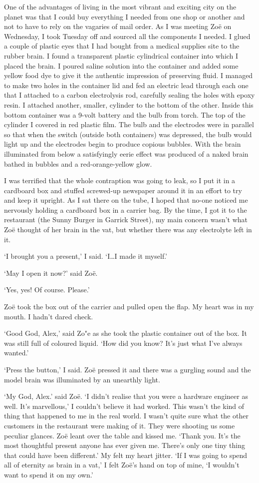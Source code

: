 One of the advantages of living in the most vibrant and exciting
city on the planet was that I could buy everything I needed from one
shop or another and not to have to rely on the vagaries of mail
order. As I was meeting Zoë on Wednesday, I took Tuesday off
and sourced  all the components I needed. I glued a couple of
plastic eyes that I had bought from a medical supplies site to the
rubber brain. I found a transparent plastic cylindrical container
into which I placed the brain. I poured saline solution into the
container and added some yellow food dye to give it the authentic
impression of preserving fluid. I managed to make two holes in the
container lid and fed an electric lead through each one that I
attached to a carbon electrolysis rod, carefully sealing the holes
with epoxy resin. I attached another, smaller, cylinder to the
bottom of the other. Inside this bottom container was a 9-volt battery and the bulb from torch. The top of the
cylinder I covered in red plastic film. The bulb and the electrodes
were in parallel so that when the switch (outside both containers)
was depressed, the bulb would light up and the electrodes begin to
produce copious bubbles. With the brain illuminated from below a
satisfyingly eerie effect was produced of a naked brain bathed in
bubbles and a red-orange-yellow glow.

I was terrified that the whole contraption was going to leak, so I
put it in a cardboard box and stuffed screwed-up newspaper around it
in an effort to try and keep it upright. As I sat there on the tube,
I hoped that no-one noticed me nervously holding a cardboard box in
a carrier bag. By the time, I got it to the restaurant (the Sunny
Burger in Garrick Street), my main concern wasn't what Zoë
thought of her brain in the vat, but whether there was any
electrolyte left in it.

`I brought you a present,' I said. `I\dots I made it myself.'

`May I open it now?' said Zoë.

`Yes, yes! Of course. Please.'

Zoë took the box out of the carrier and pulled open the flap. My
heart was in my mouth. I hadn't dared check.

`Good God, Alex,' said Zo{"e} as she took the plastic container out
of the box. It was still full of coloured liquid. `How did you know?
It's just what I've always wanted.'

`Press the button,' I said. Zoë pressed it and there was a
gurgling sound and the model brain was illuminated by an unearthly
light.

`My God, Alex.' said Zoë. `I didn't realise that you were a
hardware engineer as well. It's marvellous,' I couldn't believe it
had worked. This wasn't the kind of thing that happened to me in the
real world. I wasn't quite sure what the other customers in the
restaurant were making of it. They were shooting us some peculiar
glances. Zoë leant over the table and kissed me. `Thank you.
It's the most thoughtful present anyone has ever given me. There's
only one tiny thing that could have been different.' My felt my
heart jitter. `If I was going to spend all of eternity as brain in a
vat,' I felt Zoë's hand on top of mine, `I wouldn't want to
spend it on my own.'
\vfill\eject
